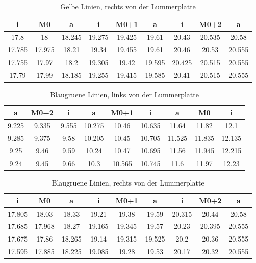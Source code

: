 \documentclass[a4paper,parskip,11pt, DIV12]{scrreprt}
\begin{document}
	\begin{table}[H]	
	\begin{tabular}{|c|c|c||c|c|c||c|c|c|}
	\hline 
i	&	M0	&	a	&	i	&	M0+1	&	a	&	i	&	M0+2	&	a	\\
	\hline
	\hline
17.8	&	18	&	18.245	&	19.275	&	19.425	&	19.61	&	20.43	&	20.535	&	20.58	\\
	\hline
17.785	&	17.975	&	18.21	&	19.34	&	19.455	&	19.61	&	20.46	&	20.53	&	20.555	\\
	\hline
17.755	&	17.97	&	18.2	&	19.305	&	19.42	&	19.595	&	20.425	&	20.515	&	20.555	\\
	\hline
17.79	&	17.99	&	18.185	&	19.255	&	19.415	&	19.585	&	20.41	&	20.515	&	20.555	\\
	\hline
	\end{tabular} 
	\caption{Gelbe Linien, rechts von der Lummerplatte}
	\end{table}
	
	\begin{table}[H]	
	\begin{tabular}{|c|c|c||c|c|c||c|c|c|}
	\hline 
a	&	M0+2	&	i	&	a	&	M0+1	&	i	&	a	&	M0	&	i	\\
	\hline
	\hline
9.225	&	9.335	&	9.555	&	10.275	&	10.46	&	10.635	&	11.64	&	11.82	&	12.1	\\
	\hline
9.285	&	9.375	&	9.58	&	10.205	&	10.45	&	10.705	&	11.525	&	11.835	&	12.135	\\
	\hline
9.25	&	9.46	&	9.59	&	10.24	&	10.47	&	10.695	&	11.56	&	11.945	&	12.215	\\
	\hline
9.24	&	9.45	&	9.66	&	10.3	&	10.565	&	10.745	&	11.6	&	11.97	&	12.23	\\
	\hline
	\end{tabular} 
	\caption{Blaugruene Linien, links von der Lummerplatte}
	\end{table}
	
	
	\begin{table}[H]
	\begin{tabular}{|c|c|c||c|c|c||c|c|c|}
	\hline 
i	&	M0	&	a	&	i	&	M0+1	&	a	&	i	&	M0+2	&	a	\\
	\hline
	\hline
17.805	&	18.03	&	18.33	&	19.21	&	19.38	&	19.59	&	20.315	&	20.44	&	20.58	\\
	\hline
17.685	&	17.968	&	18.27	&	19.165	&	19.345	&	19.57	&	20.23	&	20.395	&	20.555	\\
	\hline
17.675	&	17.86	&	18.265	&	19.14	&	19.315	&	19.525	&	20.2	&	20.36	&	20.555	\\
	\hline
17.595	&	17.885	&	18.225	&	19.085	&	19.28	&	19.53	&	20.17	&	20.32	&	20.555	\\
	\hline
	\end{tabular} 
	\caption{Blaugruene Linien, rechts von der Lummerplatte}
	\end{table}
	
\end{document}
